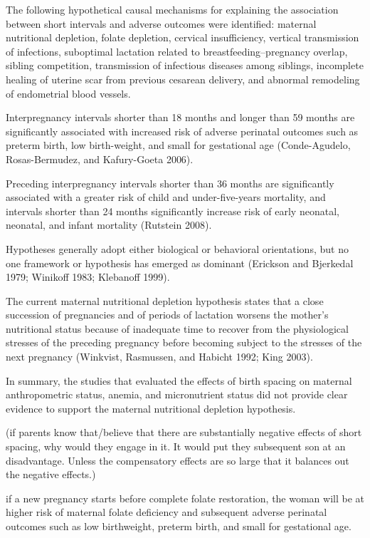 The following hypothetical causal mechanisms for explaining the
association between short intervals and adverse outcomes were
identified: maternal nutritional depletion, folate depletion, cervical
insufficiency, vertical transmission of infections, suboptimal lactation
related to breastfeeding–pregnancy overlap, sibling competition,
transmission of infectious diseases among siblings, incomplete healing
of uterine scar from previous cesarean delivery, and abnormal remodeling
of endometrial blood vessels.

Interpregnancy intervals shorter than 18 months and longer than 59
months are significantly associated with increased risk of adverse
perinatal outcomes such as preterm birth, low birth-weight, and small
for gestational age (Conde-Agudelo, Rosas-Bermudez, and Kafury-Goeta
2006).

Preceding interpregnancy intervals shorter than 36 months are
significantly associated with a greater risk of child and
under-five-years mortality, and intervals shorter than 24 months
significantly increase risk of early neonatal, neonatal, and infant
mortality (Rutstein 2008).

Hypotheses generally adopt either biological or behavioral orientations,
but no one framework or hypothesis has emerged as dominant (Erickson and
Bjerkedal 1979; Winikoff 1983; Klebanoff 1999).

The current maternal nutritional depletion hypothesis states that a
close succession of pregnancies and of periods of lactation worsens the
mother’s nutritional status because of inadequate time to recover from
the physiological stresses of the preceding pregnancy before becoming
subject to the stresses of the next pregnancy (Winkvist, Rasmussen, and
Habicht 1992; King 2003).

In summary, the studies that evaluated the effects of birth spacing on
maternal anthropometric status, anemia, and micronutrient status did not
provide clear evidence to support the maternal nutritional depletion
hypothesis.

(if parents know that/believe that there are substantially negative 
effects of short spacing, why would they engage in it. It would put
they subsequent son at an disadvantage. Unless the compensatory effects
are so large that it balances out the negative effects.)

if a new pregnancy starts before complete folate restoration, the woman
will be at higher risk of maternal folate deficiency and subsequent
adverse perinatal outcomes such as low birthweight, preterm birth, and
small for gestational age.

